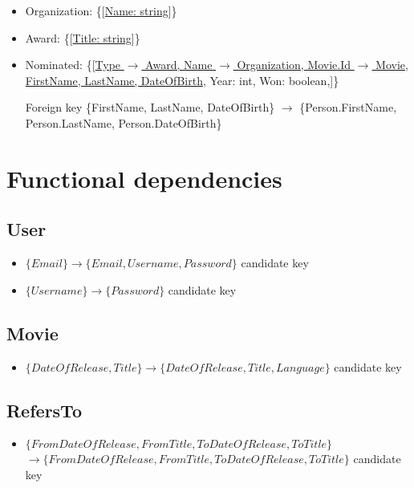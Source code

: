 \begin{itemize}
\item Organization: \{[\underline{Name: string}]\}

\item Award: \{[\underline{Title: string}]\}

\item Nominated: \{[\underline{Type $ \rightarrow $ Award, Name $ \rightarrow $ Organization, Movie.Id $\rightarrow$ Movie,}\\
\underline{FirstName, LastName, DateOfBirth}, Year: int, Won: boolean,]\}

Foreign key \{FirstName, LastName, DateOfBirth\} $ \rightarrow $ \{Person.FirstName, Person.LastName, 
Person.DateOfBirth\}
\end{itemize}

\section{Functional dependencies}

\subsection*{User}
\begin{itemize}
\item{$\{Email\} \rightarrow \{Email, Username, Password\}$} candidate key
\item{$\{Username\} \rightarrow \{Password\}$ candidate key}
\end{itemize}

\subsection*{Movie}
\begin{itemize}
\item{$\{DateOfRelease, Title\} \rightarrow \{DateOfRelease, Title, Language\}$ candidate key}
\end{itemize}

\subsection*{RefersTo}
\begin{itemize}
\item{$\{FromDateOfRelease, FromTitle, ToDateOfRelease, ToTitle\}$\\
$\rightarrow \{FromDateOfRelease, FromTitle, ToDateOfRelease, ToTitle\}$ candidate key}
\end{itemize}

